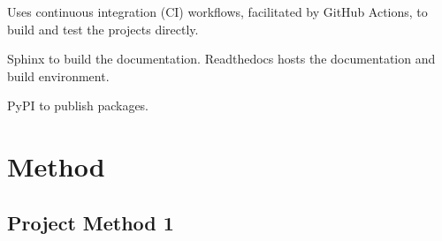 Uses continuous integration (CI) workflows, facilitated by GitHub Actions, to build and test the projects directly.

Sphinx to build the documentation. Readthedocs hosts the documentation and build environment. 

PyPI to publish packages. 

\section{Method}\label{sec:Method}

\subsection{Project Method 1}\label{sec:project method}

